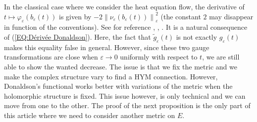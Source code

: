 \documentclass{article}
\theoremstyle{remark}
\theoremstyle{definition}
\newcommand{\norme}[1]{\left\| #1 \right\|}
\begin{document}
In the classical case where we consider the heat equation flow, the derivative of $t \mapsto \varphi_\varepsilon(b_\varepsilon(t))$ is given by $-2\norme{\nu_\varepsilon(b_\varepsilon(t))}_\varepsilon^2$ (the constant $2$ may disappear in function of the conventions). See for reference \cite[Proposition 6.9.1]{Kobayashi}, \cite[Lemma 7.1]{Simpson}, \cite[Section 1.2]{Donaldson}. It is a natural consequence of (\ref{EQ:Dérivée Donaldson}). Here, the fact that $\tilde{g}_\varepsilon(t)$ is not exactly $g_\varepsilon(t)$ makes this equality false in general. However, since these two gauge transformations are close when $\varepsilon \rightarrow 0$ uniformly with respect to $t$, we are still able to show the wanted decrease. The issue is that we fix the metric and we make the complex structure vary to find a HYM connection. However, Donaldson's functional works better with variations of the metric when the holomorphic structure is fixed. This issue however, is only technical and we can move from one to the other. The proof of the next proposition is the only part of this article where we need to consider another metric on $E$.
\end{document}
